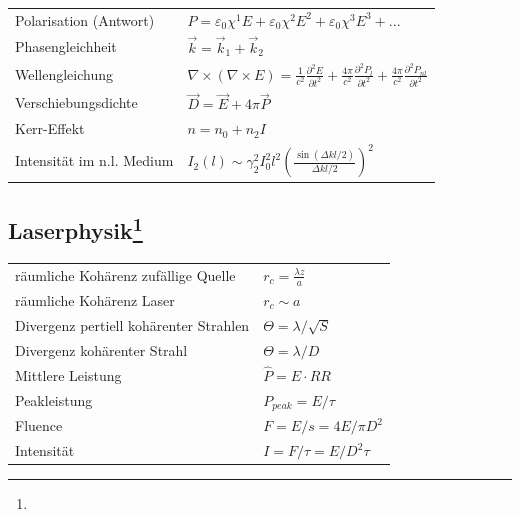 \documentclass[12pt,a4paper]{article}
\newcommand{\pdd}[2]{\frac{\partial^2 #1}{\partial #2^2}}
\renewcommand{\=}[1]{\stackrel{#1}{=}}
\theoremstyle{definition}
\theoremstyle{remark}
\begin{document}
\begin{minipage}[t]{.49\linewidth}
\vspace{0pt}
\noindent\begin{tabular}{ll}
Polarisation (Antwort) & $P = \varepsilon_0 \chi^1 E + \varepsilon_0 \chi^2 E^2 + \varepsilon_0 \chi^3 E^3 + ...$\\
Phasengleichheit & $\vec k = \vec k_1 + \vec k_2$\\
Wellengleichung & $\nabla \times (\nabla \times E) = \frac{1}{c^2} \pdd{E}{t} + \frac{4\pi}{c^2} \pdd{P_l}{t} + \frac{4\pi}{c^2} \pdd{P_{nl}}{t}$\\
Verschiebungsdichte & $\vec D = \vec E + 4 \pi \vec P$\\
Kerr-Effekt & $n = n_0 + n_2 I$\\
Intensität im n.l. Medium & $I_2(l) \sim \gamma_2^2 I_0^2 l^2 (\frac{\sin(\Delta k l/2)}{\Delta k l / 2})^2$\\
\end{tabular}
\end{minipage}%
\begin{minipage}[t]{.49\linewidth}
\vspace{0pt}

\end{minipage}



\subsection[Laserphysik]{Laserphysik\let\thefootnote\relax\footnote{}}

\begin{minipage}[t]{.49\linewidth}
\vspace{0pt}
\noindent\begin{tabular}{ll}
räumliche Kohärenz zufällige Quelle & $r_c = \frac{\lambda z}{a}$\\
räumliche Kohärenz Laser & $r_c \sim a$\\
Divergenz pertiell kohärenter Strahlen & $\Theta = \lambda / \sqrt{S}$\\
Divergenz kohärenter Strahl & $\Theta = \lambda / D$\\
Mittlere Leistung & $\hat P = E \cdot RR$\\
Peakleistung & $P_{peak} = E/\tau$\\
Fluence & $F = E/s = 4E/\pi D^2$\\
Intensität & $I = F/\tau = E/D^2 \tau$\\

\end{tabular}
\end{minipage}%
\begin{minipage}[t]{.49\linewidth}
\vspace{0pt}

\end{minipage}
\end{document}
